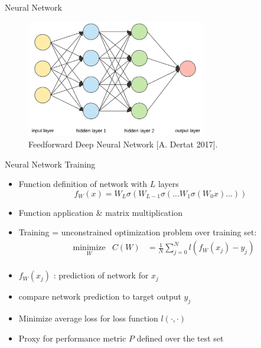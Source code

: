 \documentclass[11pt,t]{beamer}
\begin{document}
\begin{frame}[fragile]{Neural Network}
   \begin{figure}
	\centering
	\includegraphics[width=0.7\textwidth]{network}
	\caption*{Feedforward Deep Neural Network [A. Dertat 2017].}
	\end{figure}
\end{frame}


\begin{frame}[fragile]{Neural Network Training}
   \begin{itemize}
      \item Function definition of network with $L$ layers
      \begin{equation*}
         f_W(x) = W_L\sigma(W_{L-1}\sigma(...W_1\sigma(W_0x)...))
      \end{equation*}
      \item Function application \& matrix multiplication
      \item Training = unconstrained optimization problem over training set:
      \begin{equation*}
      \begin{aligned}
      & \underset{W}{\text{minimize}}
      & C(W) &= \frac{1}{N}\sum\limits_{j=0}^{N}l(f_W(x_j)-y_j) \\
      \end{aligned}
      \end{equation*}
      \item $f_W(x_j)$ : prediction of network for $x_j$
      \item compare network prediction to target output $y_j$
      \item Minimize average loss for loss function $l(\cdot,\cdot)$
      \item Proxy for performance metric $P$ defined over the test set
   \end{itemize}
\end{frame}
\end{document}
